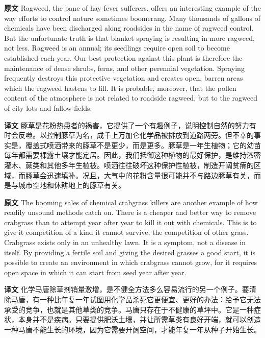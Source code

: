 \documentclass[UTF8,zihao=-4]{ctexart}
\begin{document}
\noindent\textbf{原文} Ragweed, the bane of hay fever sufferers, offers an interesting example of the way efforts to control nature sometimes boomerang. Many thousands of gallons of chemicals have been discharged along roadsides in the name of ragweed control. But the unfortunate truth is that blanket spraying is resulting in more ragweed, not less. Ragweed is an annual; its seedlings require open soil to become established each year. Our best protection against this plant is therefore the maintenance of dense shrubs, ferns, and other perennial vegetation. Spraying frequently destroys this protective vegetation and creates open, barren areas which the ragweed hastens to fill. It is probable, moreover, that the pollen content of the atmosphere is not related to roadside ragweed, but to the ragweed of city lots and fallow fields.
\par
\noindent\textbf{译文} 豚草是花粉热患者的祸害，它提供了一个有趣例子，说明控制自然的努力有时会反噬。以控制豚草为名，成千上万加仑化学品被排放到道路两旁。但不幸的事实是，覆盖式喷洒带来的豚草不是更少，而是更多。豚草是一年生植物；它的幼苗每年都需要裸露土壤才能定居。因此，我们抵御这种植物的最好保护，是维持浓密灌木、蕨类和其他多年生植被。喷洒往往破坏这种保护性植被，制造开阔贫瘠的区域，而豚草会迅速填补。况且，大气中的花粉含量很可能并不与路边豚草有关，而是与城市空地和休耕地上的豚草有关。
\par\medskip

\noindent\textbf{原文} The booming sales of chemical crabgrass killers are another example of how readily unsound methods catch on. There is a cheaper and better way to remove crabgrass than to attempt year after year to kill it out with chemicals. This is to give it competition of a kind it cannot survive, the competition of other grass. Crabgrass exists only in an unhealthy lawn. It is a symptom, not a disease in itself. By providing a fertile soil and giving the desired grasses a good start, it is possible to create an environment in which crabgrass cannot grow, for it requires open space in which it can start from seed year after year.
\par
\noindent\textbf{译文} 化学马唐除草剂销量激增，是不健全方法多么容易流行的另一个例子。要清除马唐，有一种比年复一年试图用化学品杀死它更便宜、更好的办法：给予它无法承受的竞争，也就是其他草类的竞争。马唐只存在于不健康的草坪中。它是一种症状，本身并不是疾病。只要提供肥沃土壤，并让所需草类有良好开端，就可以创造一种马唐不能生长的环境，因为它需要开阔空间，才能年复一年从种子开始生长。
\par\medskip
\end{document}
